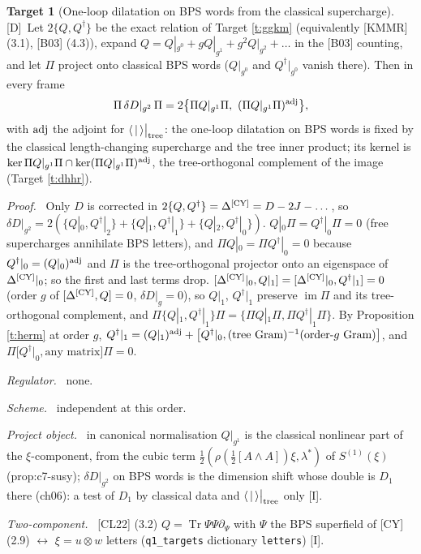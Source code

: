 \documentclass[11pt]{article}
\theoremstyle{definition}
\newtheorem{target}{Target}
\newcommand{\Tr}{\operatorname{Tr}}
\newcommand{\Dl}{\textup{[D]}}
\newcommand{\Il}{\textup{[I]}}
\newcommand{\tree}{\big|_{\rm tree}}
\newcommand{\fld}[1]{\par\textit{#1.}\ }
\begin{document}
\begin{target}[One-loop dilatation on BPS words from the classical supercharge]\label{t:bps}
\Dl\ Let $2\{Q,Q^\dagger\}$ be the exact relation of Target \ref{t:ggkm} (equivalently [KMMR] (3.1), [B03] (4.3)), expand $Q=Q|_{g^0}+gQ|_{g^1}+g^2Q|_{g^2}+\dots$ in the [B03] counting, and let $\Pi$ project onto classical BPS words ($Q|_{g^0}$ and $Q^\dagger|_{g^0}$ vanish there). Then in every frame
\[
\Pi\,\delta D|_{g^2}\,\Pi=2\big\{\Pi Q|_{g^1}\Pi,\ (\Pi Q|_{g^1}\Pi)^{\rm adj}\big\},
\]
with ${\rm adj}$ the adjoint for $\langle\,|\,\rangle\tree$: the one-loop dilatation on BPS words is fixed by the classical length-changing supercharge and the tree inner product; its kernel is $\ker\Pi Q|_{g^1}\Pi\cap\ker(\Pi Q|_{g^1}\Pi)^{\rm adj}$, the tree-orthogonal complement of the image (Target \ref{t:dhhr}).
\fld{Proof} Only $D$ is corrected in $2\{Q,Q^\dagger\}=\Delta^{\rm[CY]}=D-2J-\dots$, so $\delta D|_{g^2}=2(\{Q|_0,Q^\dagger|_2\}+\{Q|_1,Q^\dagger|_1\}+\{Q|_2,Q^\dagger|_0\})$. $Q|_0\Pi=Q^\dagger|_0\Pi=0$ (free supercharges annihilate BPS letters), and $\Pi Q|_0=\Pi Q^\dagger|_0=0$ because $Q^\dagger|_0=(Q|_0)^{\rm adj}$ and $\Pi$ is the tree-orthogonal projector onto an eigenspace of $\Delta^{\rm[CY]}|_0$; so the first and last terms drop. $[\Delta^{\rm[CY]}|_0,Q|_1]=[\Delta^{\rm[CY]}|_0,Q^\dagger|_1]=0$ (order $g$ of $[\Delta^{\rm[CY]},Q]=0$, $\delta D|_g=0$), so $Q|_1$, $Q^\dagger|_1$ preserve $\operatorname{im}\Pi$ and its tree-orthogonal complement, and $\Pi\{Q|_1,Q^\dagger|_1\}\Pi=\{\Pi Q|_1\Pi,\Pi Q^\dagger|_1\Pi\}$. By Proposition \ref{t:herm} at order $g$, $Q^\dagger|_1=(Q|_1)^{\rm adj}+\big[Q^\dagger|_0,(\text{tree Gram})^{-1}(\text{order-}g\text{ Gram})\big]$, and $\Pi\big[Q^\dagger|_0,\text{any matrix}\big]\Pi=0$.
\fld{Regulator} none. \fld{Scheme} independent at this order.
\fld{Project object} in canonical normalisation $Q|_{g^1}$ is the classical nonlinear part of the $\xi$-component, from the cubic term $\tfrac12(\rho(\tfrac12[A\wedge A])\xi,\lambda^*)$ of $S^{(1)}(\xi)$ (prop:c7-susy); $\delta D|_{g^2}$ on BPS words is the dimension shift whose double is $D_1$ there (ch06): a test of $D_1$ by classical data and $\langle\,|\,\rangle\tree$ only \Il.
\fld{Two-component} [CL22] (3.2) $Q=\Tr\Psi\Psi\partial_\Psi$ with $\Psi$ the BPS superfield of [CY] (2.9) $\leftrightarrow$ $\xi=u\otimes w$ letters (\texttt{q1\_targets} dictionary \texttt{letters}) \Il.
\end{target}
\end{document}
